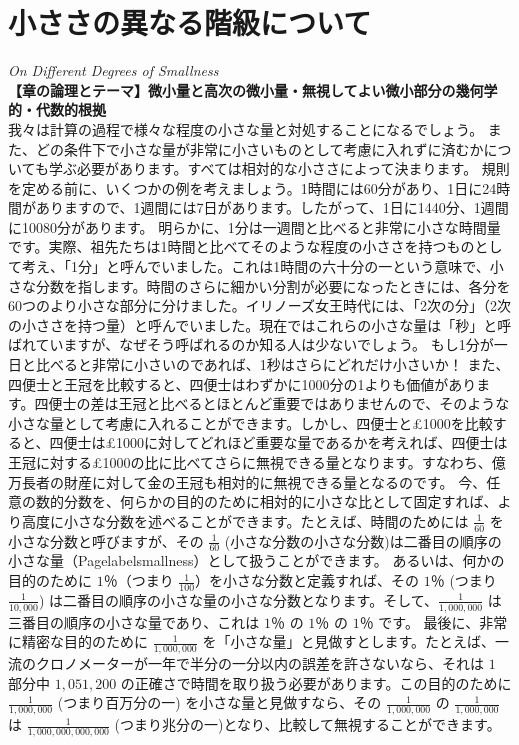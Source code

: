 \documentclass[a4paper,11pt,openany]{ltjsbook}
\begin{document}
\chapter{小ささの異なる階級について}
\noindent\textit{\large On Different Degrees of Smallness}\\[2mm]
\noindent\textbf{\small 【章の論理とテーマ】微小量と高次の微小量・無視してよい微小部分の幾何学的・代数的根拠}\\[4mm]
我々は計算の過程で様々な程度の小さな量と対処することになるでしょう。
また、どの条件下で小さな量が非常に小さいものとして考慮に入れずに済むかについても学ぶ必要があります。すべては相対的な小ささによって決まります。
規則を定める前に、いくつかの例を考えましょう。1時間には60分があり、1日に24時間がありますので、1週間には7日があります。したがって、1日に1440分、1週間に10080分があります。
明らかに、1分は一週間と比べると非常に小さな時間量です。実際、祖先たちは1時間と比べてそのような程度の小ささを持つものとして考え、「1分」と呼んでいました。これは1時間の六十分の一という意味で、小さな分数を指します。時間のさらに細かい分割が必要になったときには、各分を60つのより小さな部分に分けました。イリノーズ女王時代には、「2次の分」（2次の小ささを持つ量）と呼んでいました。現在ではこれらの小さな量は「秒」と呼ばれていますが、なぜそう呼ばれるのか知る人は少ないでしょう。
もし1分が一日と比べると非常に小さいのであれば、1秒はさらにどれだけ小さいか！
また、四便士と王冠を比較すると、四便士はわずかに1000分の1よりも価値があります。四便士の差は王冠と比べるとほとんど重要ではありませんので、そのような小さな量として考慮に入れることができます。しかし、四便士と£1000を比較すると、四便士は£1000に対してどれほど重要な量であるかを考えれば、四便士は王冠に対する£1000の比に比べてさらに無視できる量となります。すなわち、億万長者の財産に対して金の王冠も相対的に無視できる量となるのです。
今、任意の数的分数を、何らかの目的のために相対的に小さな比として固定すれば、より高度に小さな分数を述べることができます。たとえば、時間のためには $\frac{1}{60}$ を小さな分数と呼びますが、その $\frac{1}{60}$ (小さな分数の小さな分数)は二番目の順序の小さな量（Pagelabel{smallness}）として扱うことができます。
あるいは、何かの目的のために $1$％（つまり $\frac{1}{100}$）を小さな分数と定義すれば、その $1$％ (つまり $\frac{1}{10,000}$) は二番目の順序の小さな量の小さな分数となります。そして、$\frac{1}{1,000,000}$ は三番目の順序の小さな量であり、これは $1$％ の $1$％ の $1$％ です。
最後に、非常に精密な目的のために $\frac{1}{1,000,000}$ を「小さな量」と見做すとします。たとえば、一流のクロノメーターが一年で半分の一分以内の誤差を許さないなら、それは $1$ 部分中 $1,051,200$ の正確さで時間を取り扱う必要があります。この目的のために $\frac{1}{1,000,000}$ (つまり百万分の一) を小さな量と見做すなら、その $\frac{1}{1,000,000}$ の $\frac{1}{1,000,000}$ は $\frac{1}{1,000,000,000,000}$ (つまり兆分の一)となり、比較して無視することができます。
\end{document}
